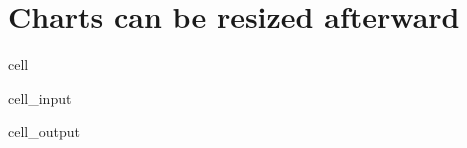 \documentclass[letterpaper,10pt,english]{jupyterBook}
\begin{document}
\section{Charts can be resized afterward}
\label{\detokenize{content/howto/keep/Create and modify charts with keep_plot:charts-can-be-resized-afterward}}
\begin{sphinxuseclass}{cell}\begin{sphinxVerbatimInput}

\begin{sphinxuseclass}{cell_input}
\begin{sphinxVerbatim}[commandchars=\\\{\}]
\end{sphinxVerbatim}

\end{sphinxuseclass}\end{sphinxVerbatimInput}
\begin{sphinxVerbatimOutput}

\begin{sphinxuseclass}{cell_output}
\noindent{}

\end{sphinxuseclass}\end{sphinxVerbatimOutput}

\end{sphinxuseclass}
\end{document}
